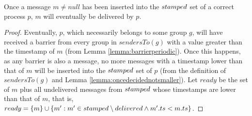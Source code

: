 \documentclass[times, 10pt]{article}
\begin{document}
\begin{lems} \label{lemma:oncebpwilldel}
Once a message $m \neq null$ has been inserted into the $stamped$ set of a correct process $p$, $m$ will eventually be delivered by $p$.
\end{lems}

\begin{proof}
Eventually, $p$, which necessarily belongs to some group $g$, will have received a barrier from every group in $sendersTo(g)$ with a value greater than the timestamp of $m$ (from Lemma \ref{lemma:barrierperiodic}). Once this happens, as any barrier is also a message, no more messages with a timestamp lower than that of $m$ will be inserted into the $stamped$ set of $p$ (from the definition of $sendersTo(g)$ and Lemma \ref{lemma:oncedecidednotsmaller}). Let $ready$ be the set of $m$ plus all undelivered messages from $stamped$ whose timestamps are lower than that of $m$, that is, $ready = \{m\} \cup \{m' : m' \in stamped \setminus delivered \wedge m'.ts < m.ts\}$.


\end{proof}
\end{document}
